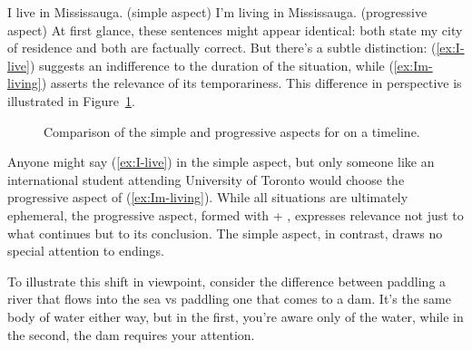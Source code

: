 \ea
\ea I live in Mississauga. \hfill(simple aspect) \label{ex:I-live}
\ex I'm living in Mississauga. \hfill(progressive aspect) \label{ex:Im-living}
\z\z
At first glance, these sentences might appear identical: both state my city of residence and both are factually correct. But there's a subtle distinction: (\ref{ex:I-live}) suggests an indifference to the duration of the situation, while (\ref{ex:Im-living}) asserts the relevance of its temporariness. This difference in perspective is illustrated in Figure~\ref{fig:enter-label}.

\begin{figure}
    \caption{Comparison of the simple and progressive aspects for  on a timeline.}
    \label{fig:enter-label}
\end{figure}

Anyone might say (\ref{ex:I-live}) in the simple aspect, but only someone like an international student attending University of Toronto would choose the progressive aspect of (\ref{ex:Im-living}). While all situations are ultimately ephemeral, the progressive aspect, formed with  + , expresses relevance not just to what continues but to its conclusion. The simple aspect, in contrast, draws no special attention to endings.

To illustrate this shift in viewpoint, consider the difference between paddling a river that flows into the sea vs paddling one that comes to a dam. It's the same body of water either way, but in the first, you're aware only of the water, while in the second, the dam requires your attention.

